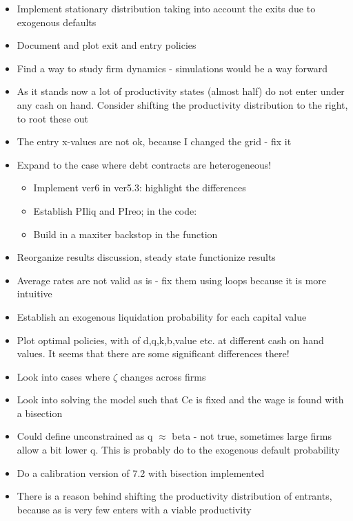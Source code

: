\documentclass[12pt]{article}
\begin{document}
\begin{itemize}
    \item Implement stationary distribution taking into account the exits due to exogenous defaults \checkmark
    \item Document and plot exit and entry policies \checkmark
    \item Find a way to study firm dynamics - simulations would be a way forward \checkmark
    \item As it stands now a lot of productivity states (almost half) do not enter under any cash on hand. Consider shifting the productivity distribution to the right, to root these out
    \item The entry x-values are not ok, because I changed the grid - fix it \checkmark
    \item Expand to the case where debt contracts are heterogeneous! \checkmark
    \begin{itemize}
        \item Implement ver6 in ver5.3: highlight the differences  \checkmark
        \item Establish PIliq and PIreo; in the code: \checkmark 
        \item Build in a maxiter backstop in the function \checkmark
    \end{itemize}
    \item Reorganize results discussion, steady state functionize results  \checkmark
    \item Average rates are not valid as is - fix them using loops because it is more intuitive  \checkmark
    \item Establish an exogenous liquidation probability for each capital value 
    \item Plot optimal policies, with of d,q,k,b,value etc. at different cash on hand values. It seems that there are some significant differences there!
    \item Look into cases where $\zeta$ changes across firms
    \item Look into solving the model such that Ce is fixed and the wage is found with a bisection
    \item Could define unconstrained as q $\approx$ beta - not true, sometimes large firms allow a bit lower q. This is probably do to the exogenous default probability \checkmark
    \item Do a calibration version of 7.2 with bisection implemented
    \item There is a reason behind shifting the productivity distribution of entrants, because as is very few enters with a viable productivity

\end{itemize}
\end{document}
